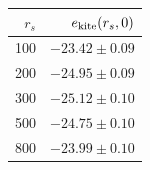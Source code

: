 \begin{tabular}{rr}
\toprule
$r_s$ & $e_{\rm kite}(r_s,0)$\\
\midrule
100 & $-23.42\pm0.09$\\
200 & $-24.95\pm0.09$\\
300 & $-25.12\pm0.10$\\
500 & $-24.75\pm0.10$\\
800 & $-23.99\pm0.10$\\
\bottomrule
\end{tabular}
